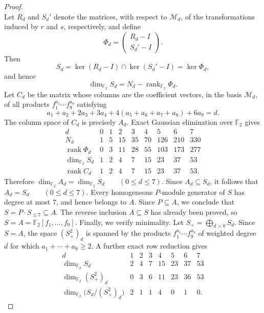 \documentclass[10pt,a4paper]{amsart}
\begin{document}
\begin{proof}
\[			\]
			Let \(R_d\) and \(S_d'\) denote the matrices, with respect to
			\(\mathcal M_d\), of the transformations induced by \(r\) and \(s\),
			respectively, and define
			\[
			\Phi_d=
			\begin{pmatrix}
			R_d-I\\ S_d'-I
			\end{pmatrix}.
			\]
			Then
			\[
			S_d=\ker(R_d-I)\cap\ker(S_d'-I)=\ker\Phi_d,
			\]
			and hence
			\[
			\dim_{\mathbb F_2}S_d=N_d-\operatorname{rank}_{\mathbb F_2}\Phi_d.
			\]
			Let \(C_d\) be the matrix whose columns are the coefficient vectors,
			in the basis \(\mathcal M_d\), of all products
			\(f_1^{a_1}\cdots f_9^{a_9}\) satisfying
			\[
			a_{1}+a_{2}+2a_{3}+3a_{4}
			+4(a_{5}+a_{6}+a_{7}+a_{8})+6a_{9}=d.
			\]
			The column space of \(C_{d}\) is precisely \(A_{d}\). Exact Gaussian elimination over \(\mathbb F_{2}\) gives
			\[
			\begin{array}{c|rrrrrrrr}
				d&0&1&2&3&4&5&6&7\\ \hline
				N_{d}
				&1&5&15&35&70&126&210&330\\
				\operatorname{rank}\Phi_{d}
				&0&3&11&28&55&103&173&277\\
				\dim_{\mathbb F_{2}}S_{d}
				&1&2&4&7&15&23&37&53\\
				\operatorname{rank}C_{d}
				&1&2&4&7&15&23&37&53.
			\end{array}
			\]
			Therefore $\dim_{\mathbb F_{2}}A_{d} =\dim_{\mathbb F_{2}}S_{d} \qquad(0\leq d\leq7)$. Since \(A_{d}\subseteq S_{d}\), it follows that $A_{d}=S_{d} \qquad(0\leq d\leq7)$. Every homogeneous \(P\)-module generator of \(S\) has degree at most \(7\), and hence belongs to \(A\). Since \(P\subseteq A\), we conclude that $ S=P\cdot S_{\leq7}\subseteq A$. The reverse inclusion \(A\subseteq S\) has already been proved, so $S=A=\mathbb F_{2}[f_{1},\ldots,f_{9}]$. Finally, we verify minimality. Let $S_{+}=\bigoplus_{d>0}S_{d}$. Since \(S=A\), the space \((S_{+}^{2})_{d}\) is spanned by the products $f_{1}^{a_{1}}\cdots f_{9}^{a_{9}}$ of weighted degree \(d\) for which $a_{1}+\cdots+a_{9}\geq2$. A further exact row reduction gives
			\[
			\begin{array}{c|rrrrrrr}
				d&1&2&3&4&5&6&7\\ \hline
				\dim_{\mathbb F_{2}}S_{d}
				&2&4&7&15&23&37&53\\
				\dim_{\mathbb F_{2}}(S_{+}^{2})_{d}
				&0&3&6&11&23&36&53\\ \hline
				\dim_{\mathbb F_{2}}
				\bigl(S_{d}/(S_{+}^{2})_{d}\bigr)
				&2&1&1&4&0&1&0.

\end{array}\]
\end{proof}
\end{document}
